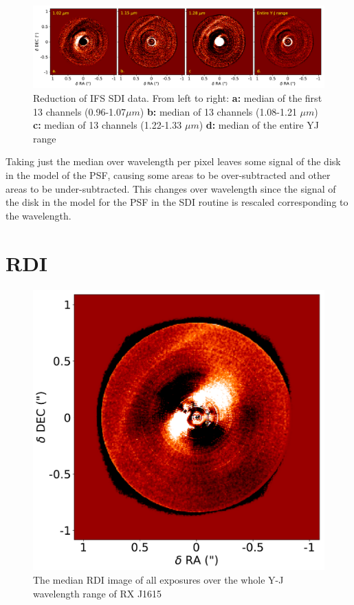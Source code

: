 \documentclass[twoside,single]{lion-msc}
\begin{document}
\begin{figure}[htb]
\centering
\includegraphics[trim={0cm 0cm 0cm 0cm},clip,width = \textwidth]{SDIwavelplot}
\caption{Reduction of IFS SDI data. From left to right: \textbf{a:} median of the first 13 channels (0.96-1.07$\mu m$) \textbf{b:} median of 13 channels (1.08-1.21 $\mu m$) \textbf{c:} median of 13 channels (1.22-1.33 $\mu m$) \textbf{d:} median of the entire YJ range}
\label{fig:SDIcolor}
\end{figure}

\noindent
Taking just the median over wavelength per pixel leaves some signal of the disk in the model of the PSF, causing some areas to be over-subtracted and other areas to be under-subtracted. This changes over wavelength since the signal of the disk in the model for the PSF in the SDI routine is rescaled corresponding to the wavelength.

\section{RDI}
\begin{figure}
\vspace{-6mm}
\centering
\includegraphics[width=1\linewidth]{RDI_tot_smallimcon}
\caption{The median RDI image of all exposures over the whole Y-J wavelength range of RX J1615}
\label{fig:RDI_tot}
\vspace{-4mm}
\end{figure}
\end{document}
